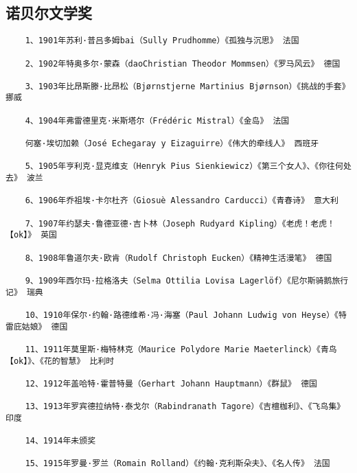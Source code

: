\documentclass[UTF8]{../RepresentationUniverse}
\begin{document}







\subsection{诺贝尔文学奖}

\begin{lstlisting}
    1、1901年苏利·普吕多姆bai（Sully Prudhomme）《孤独与沉思》 法国

    2、1902年特奥多尔·蒙森（daoChristian Theodor Mommsen）《罗马风云》 德国
    
    3、1903年比昂斯滕·比昂松（Bjørnstjerne Martinius Bjørnson）《挑战的手套》 挪威
    
    4、1904年弗雷德里克·米斯塔尔（Frédéric Mistral）《金岛》 法国
    
    何塞·埃切加赖（José Echegaray y Eizaguirre）《伟大的牵线人》 西班牙
    
    5、1905年亨利克·显克维支（Henryk Pius Sienkiewicz）《第三个女人》、《你往何处去》 波兰
    
    6、1906年乔祖埃·卡尔杜齐（Giosuè Alessandro Carducci）《青春诗》 意大利
    
    7、1907年约瑟夫·鲁德亚德·吉卜林（Joseph Rudyard Kipling）《老虎！老虎！【ok】》 英国
    
    8、1908年鲁道尔夫·欧肯（Rudolf Christoph Eucken）《精神生活漫笔》 德国
    
    9、1909年西尔玛·拉格洛夫（Selma Ottilia Lovisa Lagerlöf）《尼尔斯骑鹅旅行记》 瑞典
    
    10、1910年保尔·约翰·路德维希·冯·海塞（Paul Johann Ludwig von Heyse）《特雷庇姑娘》 德国
    
    11、1911年莫里斯·梅特林克（Maurice Polydore Marie Maeterlinck）《青鸟【ok】》、《花的智慧》 比利时
    
    12、1912年盖哈特·霍普特曼（Gerhart Johann Hauptmann）《群鼠》 德国
    
    13、1913年罗宾德拉纳特·泰戈尔（Rabindranath Tagore）《吉檀枷利》、《飞鸟集》 印度
    
    14、1914年未颁奖
    
    15、1915年罗曼·罗兰（Romain Rolland）《约翰·克利斯朵夫》、《名人传》 法国
    

\end{lstlisting}
\end{document}
